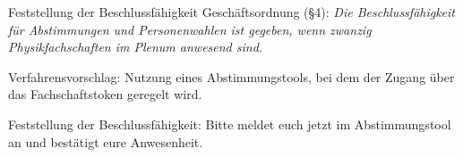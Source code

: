 \documentclass[compress, aspectratio=169]{beamer}
\begin{document}
	\begin{frame}{Feststellung der Beschlussfähigkeit} %
		Geschäftsordnung (§4): \textit{Die Beschlussfähigkeit für Abstimmungen und Personenwahlen ist gegeben, wenn zwanzig Physikfachschaften im Plenum anwesend sind.}\vspace{.5cm}
		
		Verfahrensvorschlag: Nutzung eines Abstimmungstools, bei dem der Zugang über das Fachschaftstoken geregelt wird.\vspace{.5cm}
		
		Feststellung der Beschlussfähigkeit: Bitte meldet euch jetzt im Abstimmungstool an und bestätigt eure Anwesenheit.
	\end{frame}
	
	
	
\end{document}
